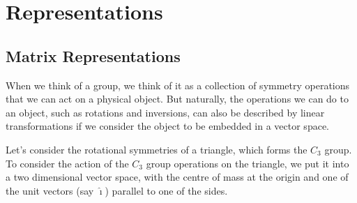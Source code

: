 \documentclass{article}
\theoremstyle{plain}\theoremheaderfont{\normalfont\itshape}\theorembodyfont{\rmfamily}\theoremseparator{.}\newtheorem*{rem}{Remark}\newtheorem*{ex}{Example}\newtheorem*{proof}{Proof}\newtheorem*{altp}{Alternative proof}
\theoremstyle{plain}\theoremheaderfont{\normalfont\bfseries}\theorembodyfont{\rmfamily}\theoremseparator{.}\newtheorem{thm}{Theorem}[section]\newtheorem{lem}[thm]{Lemma}\newtheorem{prop}[thm]{Proposition}\newtheorem*{cor}{Corollary}\newtheorem{defn}[thm]{Definition}\newtheorem{clm}[thm]{Claim}\newtheorem{clminproof}{Claim}\newtheorem*{law}{Law}\newtheorem{pos}[thm]{Postulate}
\theoremstyle{break}\theoremheaderfont{\normalfont\itshape}\theorembodyfont{\rmfamily}\theoremseparator{.\medskip}\newtheorem*{proofskip}{Proof}\newtheorem*{exs}{Examples}\newtheorem*{rems}{Remarks}
\theoremstyle{break}\theoremheaderfont{\normalfont\bfseries}\theorembodyfont{\rmfamily}\theoremseparator{.\medskip}\newtheorem{lemskip}[thm]{Lemma}\newtheorem{defnskip}[thm]{Definition}\newtheorem{propskip}[thm]{Proposition}\newtheorem{thmskip}[thm]{Theorem}
\numberwithin{equation}{section}
\newcommand{\vu}[1]{\hat{\bm{\mathrm{#1}}}}
\begin{document}
    \newpage
    \section{Representations}
    \subsection{Matrix Representations}
    When we think of a group, we think of it as a collection of symmetry operations that we can act on a physical object. But naturally, the operations we can do to an object, such as rotations and inversions, can also be described by linear transformations if we consider the object to be embedded in a vector space.

    Let's consider the rotational symmetries of a triangle, which forms the \(C_3\) group. To consider the action of the \(C_3\) group operations on the triangle, we put it into a two dimensional vector space, with the centre of mass at the origin and one of the unit vectors (say \(\vu{\imath}\)) parallel to one of the sides.

    \begin{figure}[ht!]
        \centering
    \end{figure}
\end{document}
